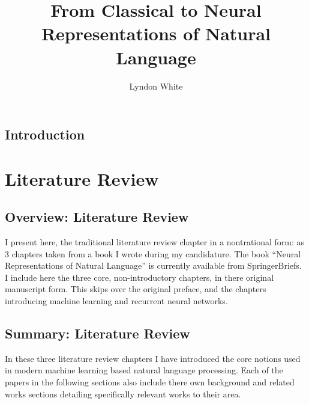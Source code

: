 \documentclass{book}
\title{From Classical to Neural Representations of Natural Language}
\author{Lyndon White}
\begin{document}
\maketitle
\tableofcontents


\chapter*{Introduction}


\part{Literature Review}
\chapter{Overview: Literature Review}
I present here, the traditional literature review chapter in a nontrational form: as 3 chapters taken from a book I wrote during my candidature.
The book ``Neural Representations of Natural Language'' is currently available from SpringerBriefs.
I include here the three core, non-introductory chapters, in there original manuscript form.
This skips over the original preface, and the chapters introducing machine learning and recurrent neural networks.



\label{LR:WordRep}
\label{LR:SenseRep}
\label{LR:SentenceRep}

\chapter{Summary: Literature Review}
In these three literature review chapters I have introduced the core notions used in modern machine learning based natural language processing.
Each of the papers in the following sections also include there own background and related works sections detailing specifically relevant works to their area.
\end{document}
